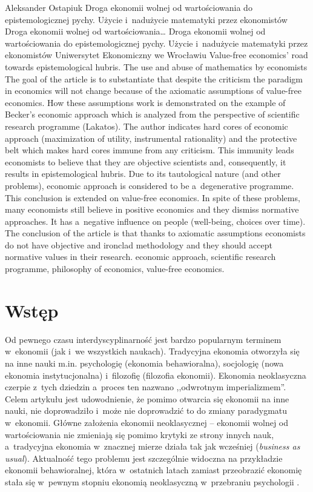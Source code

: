 \begin{artplenv}{Aleksander Ostapiuk}
	{Droga ekonomii wolnej od wartościowania do epistemologicznej pychy. Użycie i~nadużycie matematyki przez
		ekonomistów}
	{Droga ekonomii wolnej od wartościowania\ldots}
	{Droga ekonomii wolnej od wartościowania do epistemologicznej pychy. Użycie i~nadużycie matematyki przez
		ekonomistów}
	{Uniwersytet Ekonomiczny we Wrocławiu}
	{Value-free economics' road towards epistemological hubris. The use and abuse of mathematics by economists}
	{The goal of the article is to substantiate that despite the criticism the paradigm in economics will not change because of the axiomatic assumptions of value-free economics. How these assumptions work is demonstrated on the example of Becker's economic approach which is analyzed from the perspective of scientific research programme (Lakatos). The author indicates hard cores of economic approach (maximization of utility, instrumental rationality) and the protective belt which makes hard cores immune from any criticism. This immunity leads economists to believe that they are objective scientists and, consequently, it results in epistemological hubris. Due to its tautological nature (and other problems), economic approach is considered to be a~degenerative programme. This conclusion is extended on value-free economics. In spite of these problems, many economists still believe in positive economics and they dismiss normative approaches. It has a~negative influence on people (well-being, choices over time). The conclusion of the article is that thanks to axiomatic assumptions economists do not have objective and ironclad methodology and they should accept normative values in their research.}
	{economic approach, scientific research programme, philosophy of economics, value-free economics.}



\section*{Wstęp}
\lettrine[loversize=0.13,lines=2,lraise=-0.05,nindent=0em,findent=0.2pt]%
{O}{}d pewnego czasu interdyscyplinarność jest bardzo popularnym terminem w~ekonomii (jak i~we wszystkich naukach).
Tradycyjna ekonomia otworzyła się na inne nauki m.in. psychologię (ekonomia behawioralna), socjologię (nowa ekonomia
instytucjonalna) i~filozofię (filozofia ekonomii). Ekonomia neoklasyczna czerpie z~tych dziedzin a~proces ten nazwano
,,odwrotnym imperializmem''. Celem artykułu jest udowodnienie, że pomimo otwarcia się ekonomii na inne nauki, nie
doprowadziło i~może nie doprowadzić to do zmiany paradygmatu
\parencite{kuhn_structure_1962}
w~ekonomii. Główne
założenia ekonomii neoklasycznej -- ekonomii wolnej od wartościowania nie zmieniają się pomimo krytyki ze strony innych
nauk, a~tradycyjna ekonomia w~znacznej mierze działa tak jak wcześniej (\textit{business as usual}). Aktualność tego
problemu jest szczególnie widoczna na przykładzie ekonomii behawioralnej, która w~ostatnich latach zamiast przeobrazić
ekonomię stała się w~pewnym stopniu ekonomią neoklasyczną w~przebraniu psychologii
\parencite{berg_as-if_2010}.


\end{artplenv}
